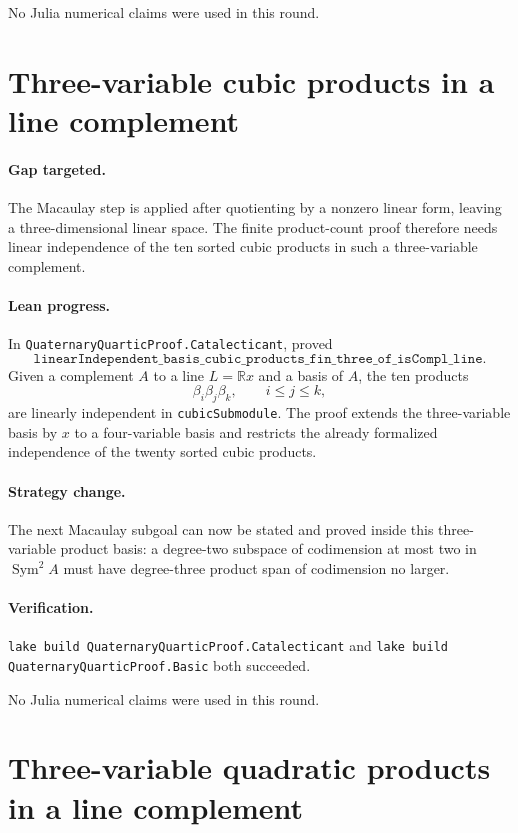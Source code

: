 \documentclass[11pt]{article}
\begin{document}
No Julia numerical claims were used in this round.

\section*{Three-variable cubic products in a line complement}

\paragraph{Gap targeted.}
The Macaulay step is applied after quotienting by a nonzero linear form,
leaving a three-dimensional linear space.  The finite product-count proof
therefore needs linear independence of the ten sorted cubic products in such
a three-variable complement.

\paragraph{Lean progress.}
In \texttt{QuaternaryQuarticProof.Catalecticant}, proved
\[
\texttt{linearIndependent\_basis\_cubic\_products\_fin\_three\_of\_isCompl\_line}.
\]
Given a complement \(A\) to a line \(L=\mathbb{R}x\) and a basis of \(A\),
the ten products
\[
\beta_i\beta_j\beta_k,\qquad i\le j\le k,
\]
are linearly independent in \texttt{cubicSubmodule}.  The proof extends the
three-variable basis by \(x\) to a four-variable basis and restricts the
already formalized independence of the twenty sorted cubic products.

\paragraph{Strategy change.}
The next Macaulay subgoal can now be stated and proved inside this
three-variable product basis: a degree-two subspace of codimension at most
two in \(\operatorname{Sym}^2 A\) must have degree-three product span of
codimension no larger.

\paragraph{Verification.}
\texttt{lake build QuaternaryQuarticProof.Catalecticant} and
\texttt{lake build QuaternaryQuarticProof.Basic} both succeeded.

No Julia numerical claims were used in this round.

\section*{Three-variable quadratic products in a line complement}
\end{document}
